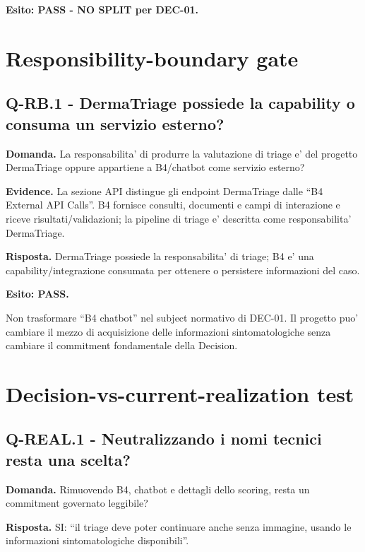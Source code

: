 \documentclass[11pt,a4paper]{article}
\begin{document}
\textbf{Esito: PASS - NO SPLIT per DEC-01.}

\section{Responsibility-boundary gate}

\subsection{Q-RB.1 - DermaTriage possiede la capability o consuma un servizio esterno?}
\begin{ddtacheck}
\textbf{Domanda.} La responsabilita' di produrre la valutazione di triage e' del progetto DermaTriage oppure appartiene a B4/chatbot come servizio esterno?
\end{ddtacheck}

\textbf{Evidence.} La sezione API distingue gli endpoint DermaTriage dalle ``B4 External API Calls''. B4 fornisce consulti, documenti e campi di interazione e riceve risultati/validazioni; la pipeline di triage e' descritta come responsabilita' DermaTriage.

\textbf{Risposta.} DermaTriage possiede la responsabilita' di triage; B4 e' una capability/integrazione consumata per ottenere o persistere informazioni del caso.

\textbf{Esito: PASS.}

\begin{ddtaworking}[title={Boundary preserved}]
Non trasformare ``B4 chatbot'' nel subject normativo di DEC-01. Il progetto puo' cambiare il mezzo di acquisizione delle informazioni sintomatologiche senza cambiare il commitment fondamentale della Decision.
\end{ddtaworking}

\section{Decision-vs-current-realization test}

\subsection{Q-REAL.1 - Neutralizzando i nomi tecnici resta una scelta?}
\begin{ddtacheck}
\textbf{Domanda.} Rimuovendo B4, chatbot e dettagli dello scoring, resta un commitment governato leggibile?
\end{ddtacheck}

\textbf{Risposta.} SI: ``il triage deve poter continuare anche senza immagine, usando le informazioni sintomatologiche disponibili''.
\end{document}
